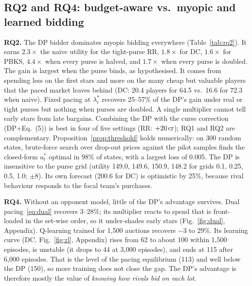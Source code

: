 \documentclass{article}
\newcommand{\1}{\mathbb{1}}
\newcommand{\crore}{\text{\,cr}}
\newcommand{\rupee}{\text{Rs.\,}}
\begin{document}
\subsection{RQ2 and RQ4: budget-aware vs.\ myopic and learned bidding}\label{sec:r-rq2}
\begin{table}[t]
\centering\small
\caption{Mean utility (\crore) of a focal team against nine opponents playing $\lambda^\ast$ (100 seeds; 95\% CI $\approx\pm2$--$12$, Fig.~\ref{fig:rq2}). RR/DC/PBKS have real purses of 41/73/110.5\crore; DC is also run with purses scaled $\times0.5$ and $\times2$ for every team. Last column: utility over the hindsight optimum~\eqref{eq:ilp}, averaged over configurations.}
\label{tab:rq2}
\resizebox{0.54\linewidth}{!}{}\hfill\resizebox{0.43\linewidth}{!}{}
\end{table}
\textbf{RQ2.} The DP bidder dominates myopic bidding everywhere (Table~\ref{tab:rq2}). It earns $2.3\times$ the naive utility for the tight-purse RR, $1.8\times$ for DC, $1.6\times$ for PBKS, $4.4\times$ when every purse is halved, and $1.7\times$ when every purse is doubled. The gain is largest when the purse binds, as hypothesised. It comes from spending less on the first stars and more on the many cheap but valuable players that the paced market leaves behind (DC: 20.4 players for \rupee64.5\crore{} vs.\ 16.6 for \rupee72.3\crore{} when naive). Fixed pacing at $\lambda^\ast_i$ recovers 25--57\% of the DP's gain under real or tight purses but nothing when purses are doubled. A single multiplier cannot tell early stars from late bargains. Combining the DP with the curse correction (DP+Eq.~(5)) is best in four of five settings (RR: $+20\crore$); RQ1 and RQ2 are complementary. Proposition~\ref{prop:threshold} holds numerically: on 300 random states, brute-force search over drop-out prices against the pilot samples finds the closed-form $a^\ast_t$ optimal in 98\% of states, with a largest loss of \rupee0.005\crore. The DP is insensitive to the purse grid (utility 149.0, 149.6, 150.9, 148.2 for grids 0.1, 0.25, 0.5, 1.0\crore; $\pm8$). Its own forecast (200.6 for DC) is optimistic by 25\%, because rival behaviour responds to the focal team's purchases.

\textbf{RQ4.} Without an opponent model, little of the DP's advantage survives. Dual pacing~\eqref{eq:dual} recovers 3--28\%; its multiplier reacts to spend that is front-loaded in the set-wise order, so it under-shades early stars (Fig.~\ref{fig:dual}, Appendix). Q-learning trained for 1{,}500 auctions recovers $-3$ to 29\%. Its learning curve (DC, Fig.~\ref{fig:rl}, Appendix) rises from 62 to about 100\crore{} within 1{,}500 episodes, is unstable (it drops to 44 at 3{,}000 episodes), and ends at 115 after 6{,}000 episodes. That is the level of the pacing equilibrium (113) and well below the DP (150), so more training does not close the gap. The DP's advantage is therefore mostly the value of \emph{knowing how rivals bid on each lot}.
\end{document}
